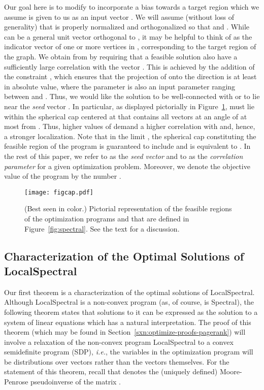 \documentclass[11pt]{article}
\begin{document}
Our goal here is to modify  to incorporate a bias 
towards a target region which we assume is given to us as an input vector .
We will assume (without loss of generality) that  is properly normalized 
and orthogonalized so that  and . 
While  can be a general unit vector orthogonal to , it may be helpful 
to think of  as the indicator vector of one or more vertices in , 
corresponding to the target region of the graph.
We obtain  from  
by requiring that a feasible solution also have a sufficiently large 
correlation with the vector . 
This is achieved by the addition of the constraint 
, which ensures that the projection of  onto 
the direction  is at least  in absolute value, where the 
parameter  is also an input parameter ranging between  and . 
Thus, we would like the solution to be well-connected with or to lie near 
the \emph{seed} vector . 
In particular, as displayed pictorially in Figure~\ref{fig:sphere},  must 
lie within the spherical cap centered at  that contains all vectors at an 
angle of at most  from . 
Thus, higher values of  demand a higher correlation with  and, 
hence, a stronger localization. 
Note that in the limit , the spherical cap constituting the 
feasible region of the program is guaranteed to include  and 
 is equivalent to . 
In the rest of this paper, we refer to  as the \emph{seed vector} and to 
 as the \emph{correlation parameter} for a given 
 optimization problem.  
Moreover, we denote the objective value of the program
 by the number . 

\begin{figure}[h]
\begin{center}
   \texttt{[image: figcap.pdf]}
   \end{center}
\caption{(Best seen in color.) Pictorial representation of the feasible 
regions of the optimization programs  and 
 that are defined in 
Figure~\ref{fig:spectral}.  See the text for a discussion.}
\label{fig:sphere}	
\end{figure}


\subsection{Characterization of the Optimal Solutions of \textsf{LocalSpectral}}
\label{sxn:optimize-theory}

Our first theorem is a characterization of the optimal solutions of 
\textsf{LocalSpectral}. 
Although \textsf{LocalSpectral} is a non-convex program (as, of course, is 
\textsf{Spectral}), the following theorem states that solutions to it can be 
expressed as the solution to a system of linear equations which has a 
natural interpretation.
The proof of this theorem (which may be found in 
Section~\ref{sxn:optimize-proofs-pagerank}) will involve a relaxation of the 
non-convex program \textsf{LocalSpectral} to a convex semidefinite program (SDP), 
\emph{i.e.}, the variables in the optimization program will be distributions 
over vectors rather than the vectors themselves.
For the statement of this theorem, recall that  denotes the (uniquely 
defined) Moore-Penrose pseudoinverse of the matrix .
\end{document}
